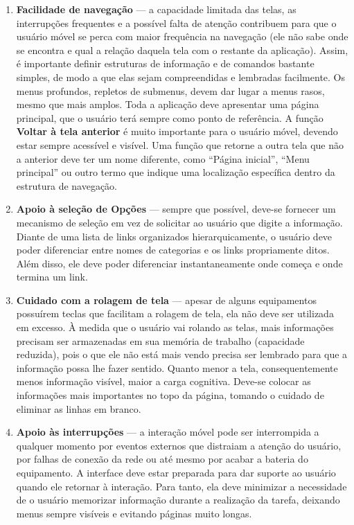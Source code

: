 \documentclass[presentation]{beamer}
\begin{document}
\begin{frame}[allowframebreaks]
\begin{enumerate}
        \item \textbf{Facilidade de navegação} --- a capacidade limitada das telas, as interrupções frequentes e a possível falta de atenção contribuem para que o usuário móvel se perca com maior frequência na navegação (ele não sabe onde se encontra e qual a relação daquela tela com o restante da aplicação). Assim, é importante definir estruturas de informação e de comandos bastante simples, de modo a que elas sejam compreendidas e lembradas facilmente. Os menus profundos, repletos de submenus, devem dar lugar a menus rasos, mesmo que mais amplos. Toda a aplicação deve apresentar uma página principal, que o usuário terá sempre como ponto de referência. A função \textbf{Voltar à tela anterior} é muito importante para o usuário móvel, devendo estar sempre acessível e visível. Uma função que retorne a outra tela que não a anterior deve ter um nome diferente, como ``Página inicial'', ``Menu principal'' ou outro termo que indique uma localização específica dentro da estrutura de navegação.  \newpage
        \item \textbf{Apoio à seleção de Opções} --- sempre que possível, deve-se fornecer um mecanismo de seleção em vez de solicitar ao usuário que digite a informação. Diante de uma lista de links organizados hierarquicamente, o usuário deve poder diferenciar entre nomes de categorias e os links propriamente ditos. Além disso, ele deve poder diferenciar instantaneamente onde começa e onde termina um link. \newpage
        \item \textbf{Cuidado com a rolagem de tela} --- apesar de alguns equipamentos possuírem teclas que facilitam a rolagem de tela, ela não deve ser utilizada em excesso. À medida que o usuário vai rolando as telas, mais informações precisam ser armazenadas em sua memória de trabalho (capacidade reduzida), pois o que ele não está mais vendo precisa ser lembrado para que a informação possa lhe fazer sentido. Quanto menor a tela, consequentemente menos informação visível, maior a carga cognitiva. Deve-se colocar as informações mais importantes no topo da página, tomando o cuidado de eliminar as linhas em branco. \newpage
        \item \textbf{Apoio às interrupções} --- a interação móvel pode ser interrompida a qualquer momento por eventos externos que distraiam a atenção do usuário, por falhas de conexão da rede ou até mesmo por acabar a bateria do equipamento. A interface deve estar preparada para dar suporte ao usuário quando ele retornar à interação. Para tanto, ela deve minimizar a necessidade de o usuário memorizar informação durante a realização da tarefa, deixando menus sempre visíveis e evitando páginas muito longas. \newpage

\end{enumerate}
\end{frame}
\end{document}
